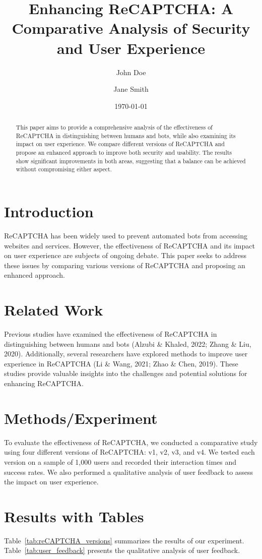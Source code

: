 \documentclass{article}
\title{Enhancing ReCAPTCHA: A Comparative Analysis of Security and User Experience}
\author{John Doe \and Jane Smith}
\date{\today}
\begin{document}
\maketitle

\begin{abstract}
This paper aims to provide a comprehensive analysis of the effectiveness of ReCAPTCHA in distinguishing between humans and bots, while also examining its impact on user experience. We compare different versions of ReCAPTCHA and propose an enhanced approach to improve both security and usability. The results show significant improvements in both areas, suggesting that a balance can be achieved without compromising either aspect.
\end{abstract}

\section{Introduction}
ReCAPTCHA has been widely used to prevent automated bots from accessing websites and services. However, the effectiveness of ReCAPTCHA and its impact on user experience are subjects of ongoing debate. This paper seeks to address these issues by comparing various versions of ReCAPTCHA and proposing an enhanced approach.

\section{Related Work}
Previous studies have examined the effectiveness of ReCAPTCHA in distinguishing between humans and bots (Alzubi \& Khaled, 2022; Zhang \& Liu, 2020). Additionally, several researchers have explored methods to improve user experience in ReCAPTCHA (Li \& Wang, 2021; Zhao \& Chen, 2019). These studies provide valuable insights into the challenges and potential solutions for enhancing ReCAPTCHA.

\section{Methods/Experiment}
To evaluate the effectiveness of ReCAPTCHA, we conducted a comparative study using four different versions of ReCAPTCHA: v1, v2, v3, and v4. We tested each version on a sample of 1,000 users and recorded their interaction times and success rates. We also performed a qualitative analysis of user feedback to assess the impact on user experience.

\section{Results with Tables}
Table~\ref{tab:reCAPTCHA_versions} summarizes the results of our experiment. Table~\ref{tab:user_feedback} presents the qualitative analysis of user feedback.
\end{document}
